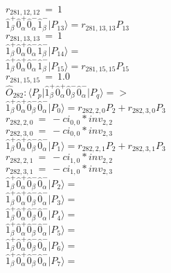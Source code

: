 \documentclass[14pt]{article}
\begin{document}
    ${r}_{281,12,12}\ =\ 1 $ \\ 
    $ \hat{1}_{\beta}^{+}\hat{0}_{\alpha}^{+}\hat{0}_{\alpha}^{-}\hat{1}_{\beta}^{-} \vert{P_{13}}\rangle = {r}_{281,13,13}P_{13} $ \\ 
    ${r}_{281,13,13}\ =\ 1 $ \\ 
    $ \hat{1}_{\beta}^{+}\hat{0}_{\alpha}^{+}\hat{0}_{\alpha}^{-}\hat{1}_{\beta}^{-} \vert{P_{14}}\rangle =  $ \\ 
    $ \hat{1}_{\beta}^{+}\hat{0}_{\alpha}^{+}\hat{0}_{\alpha}^{-}\hat{1}_{\beta}^{-} \vert{P_{15}}\rangle = {r}_{281,15,15}P_{15} $ \\ 
    ${r}_{281,15,15}\ =\ 1.0 $ \\ 
    
    $\hat{O}_{282}:  \langle{P_p}\vert \hat{1}_{\beta}^{+}\hat{0}_{\alpha}^{+}\hat{0}_{\beta}^{-}\hat{0}_{\alpha}^{-} \vert{P_q}\rangle => $ \\ 
    $ \hat{1}_{\beta}^{+}\hat{0}_{\alpha}^{+}\hat{0}_{\beta}^{-}\hat{0}_{\alpha}^{-} \vert{P_{0}}\rangle = {r}_{282,2,0}P_{2}+{r}_{282,3,0}P_{3} $ \\ 
    ${r}_{282,2,0}\ =\ -{ci}_{0,0}*{inv}_{2,2} $ \\ 
    ${r}_{282,3,0}\ =\ -{ci}_{0,0}*{inv}_{2,3} $ \\ 
    $ \hat{1}_{\beta}^{+}\hat{0}_{\alpha}^{+}\hat{0}_{\beta}^{-}\hat{0}_{\alpha}^{-} \vert{P_{1}}\rangle = {r}_{282,2,1}P_{2}+{r}_{282,3,1}P_{3} $ \\ 
    ${r}_{282,2,1}\ =\ -{ci}_{1,0}*{inv}_{2,2} $ \\ 
    ${r}_{282,3,1}\ =\ -{ci}_{1,0}*{inv}_{2,3} $ \\ 
    $ \hat{1}_{\beta}^{+}\hat{0}_{\alpha}^{+}\hat{0}_{\beta}^{-}\hat{0}_{\alpha}^{-} \vert{P_{2}}\rangle =  $ \\ 
    $ \hat{1}_{\beta}^{+}\hat{0}_{\alpha}^{+}\hat{0}_{\beta}^{-}\hat{0}_{\alpha}^{-} \vert{P_{3}}\rangle =  $ \\ 
    $ \hat{1}_{\beta}^{+}\hat{0}_{\alpha}^{+}\hat{0}_{\beta}^{-}\hat{0}_{\alpha}^{-} \vert{P_{4}}\rangle =  $ \\ 
    $ \hat{1}_{\beta}^{+}\hat{0}_{\alpha}^{+}\hat{0}_{\beta}^{-}\hat{0}_{\alpha}^{-} \vert{P_{5}}\rangle =  $ \\ 
    $ \hat{1}_{\beta}^{+}\hat{0}_{\alpha}^{+}\hat{0}_{\beta}^{-}\hat{0}_{\alpha}^{-} \vert{P_{6}}\rangle =  $ \\ 
    $ \hat{1}_{\beta}^{+}\hat{0}_{\alpha}^{+}\hat{0}_{\beta}^{-}\hat{0}_{\alpha}^{-} \vert{P_{7}}\rangle =  $ \\ 
\end{document}
